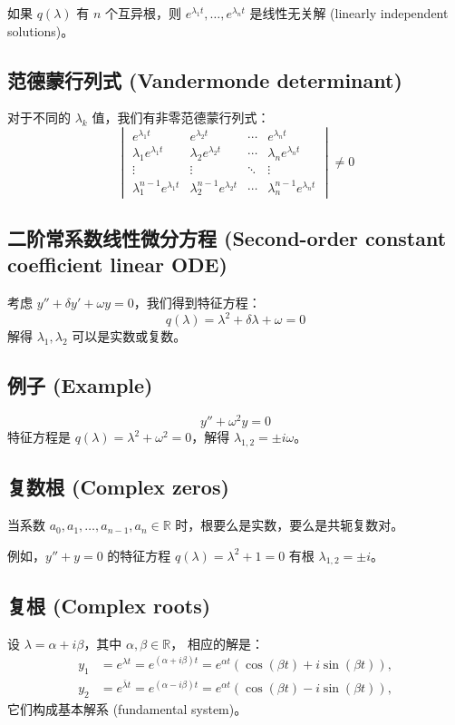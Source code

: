 \documentclass{ctexart}
\begin{document}
如果 \( q(\lambda) \) 有 \( n \) 个互异根，则 \( e^{\lambda_1 t}, \ldots, e^{\lambda_n t} \) 是线性无关解 (linearly independent solutions)。



\subsection*{范德蒙行列式 (Vandermonde determinant)}
对于不同的 \( \lambda_k \) 值，我们有非零范德蒙行列式：
\[ \begin{vmatrix}
e^{\lambda_1 t} & e^{\lambda_2 t} & \cdots & e^{\lambda_n t} \\
\lambda_1 e^{\lambda_1 t} & \lambda_2 e^{\lambda_2 t} & \cdots & \lambda_n e^{\lambda_n t} \\
\vdots & \vdots & \ddots & \vdots \\
\lambda_1^{n-1} e^{\lambda_1 t} & \lambda_2^{n-1} e^{\lambda_2 t} & \cdots & \lambda_n^{n-1} e^{\lambda_n t}
\end{vmatrix} \neq 0 \]

\subsection*{二阶常系数线性微分方程 (Second-order constant coefficient linear ODE)}
考虑 \( y'' + \delta y' + \omega y = 0 \)，我们得到特征方程：
\[ q(\lambda) = \lambda^2 + \delta \lambda + \omega = 0 \]
解得 \( \lambda_1, \lambda_2 \) 可以是实数或复数。



\subsection*{例子 (Example)}
\[ y'' + \omega^2 y = 0 \]
特征方程是 \( q(\lambda) = \lambda^2 + \omega^2 = 0 \)，解得 \( \lambda_{1,2} = \pm i \omega \)。

\subsection*{复数根 (Complex zeros)}
当系数 \( a_0, a_1, \ldots, a_{n-1}, a_n \in \mathbb{R} \) 时，根要么是实数，要么是共轭复数对。

例如，\( y'' + y = 0 \) 的特征方程 \( q(\lambda) = \lambda^2 + 1 = 0 \) 有根 \( \lambda_{1,2} = \pm i \)。




\subsection*{复根 (Complex roots)}
设 \( \lambda = \alpha + i \beta \)，其中 \( \alpha, \beta \in \mathbb{R} \)，
相应的解是：
\begin{align*}
y_1 &= e^{\lambda t} = e^{(\alpha + i \beta)t} = e^{\alpha t}(\cos(\beta t) + i\sin(\beta t)), \\
y_2 &= e^{\bar{\lambda} t} = e^{(\alpha - i \beta)t} = e^{\alpha t}(\cos(\beta t) - i\sin(\beta t)),
\end{align*}
它们构成基本解系 (fundamental system)。
\end{document}
